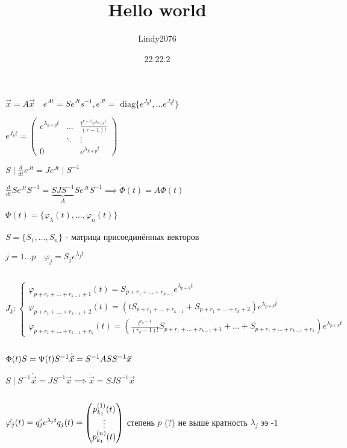 \documentclass[12pt, a4paper]{article}
\title{Hello world}
\author{Lindy2076}
\date{22.22.2} %
\begin{document}
    $\vec{x} = A \vec{x} \quad e^{At} = S e^{Jt} s^{-1}, e^{Jt} = 
        \text{ diag} \{ e^{J_0t}, \dotsc e^{J_qt}\}$

    $e^{J_kt} = 
    \begin{pmatrix}
        e^{\lambda_{k + p}t} & \dotsc & \frac{t^{r-1}e^{\lambda_{k+p}t}}{(r-1)!} \\
        & \ddots & \vdots\\
        0 & & e^{\lambda_{k+p}t}       
    \end{pmatrix}$

    $S \mid \frac{d}{dt}e^{Jt} = J e^{Jt} \mid S^{-1}$

    $\frac{d}{dt}Se^{Jt}S^{-1} = \underbrace{SJS^{-1}}_{A} Se^{Jt}S^{-1} \implies 
    \dot\Phi(t) = A\Phi(t)$

    $\Phi(t) = \{ \varphi_\lambda(t), \dotsc, \varphi_n(t)\}$

    $S = \{S_1, \dotsc, S_n\}$ - матрица присоединённых векторов

    $j=1\dotsc p \quad
    \varphi_j = S_je^{\lambda_jt}
    $

    \par $ $

    $J_k: 
    \begin{cases}
    \varphi_{p+r_r+\dotsc+r_{k-1} + 1}(t) = S_{p + r_1 + \dotsc +  r_{k-1}}
    e^{\lambda_{p+k}t} \\
    \varphi_{p+r_1 + \dotsc + r_{k-1}+2}(t) = 
    (tS_{p+ r_1 + \dotsc + r_{k-1}} + S_{p+r_1 + \dotsc + r_k + 2})e^{\lambda_{p+k}t} \\
    \varphi_{p + r_1 + \dotsc + r_{k-1} + r_k}(t) = 
    (\frac{t^{r_k-1}}{(r_k-1)!}S_{p + r_1 + \dotsc + r_{k-1} + 1} + \dotsc +
    S_{p + r_1 + \dotsc + r_{k-1} + r_k})e^{\lambda_{p+k}t}
    \end{cases}
    $   

    \par $ $

    $\Phi(t)S = \Psi(t) \\
    S^{-1}\dot{\vec{x}} = S^{-1}ASS^{-1}\vec{x}$
    
    $S \mid S^{-1} \dot\vec{x} = JS^{-1}\vec{x} \implies 
    \dot{\vec{x}} = SJS^{-1}\vec{x}$

    \par $ $

    $\vec\varphi_j(t) = \vec{q_j} e^{\lambda_jt}\\
    q_j(t) = \begin{pmatrix}
        p_{k_1}^{(1)}(t) \\ \vdots \\ p^{(n)}_{k_1}(t)
    \end{pmatrix}
    $ степень $p$ (?) не выше кратность $\lambda_j$ ээ -1
\end{document}
